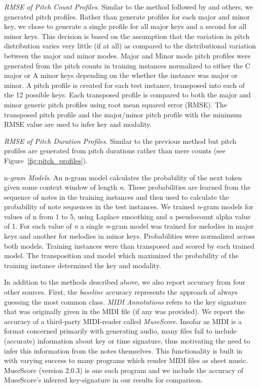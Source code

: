\documentclass[letterpaper]{article}
\begin{document}
\emph{RMSE of Pitch Count Profiles}. Similar to the method followed by \cite{krumhansl2001cognitive} and others, we generated pitch profiles. Rather than generate profiles for each major and minor key, we chose to generate a single profile for all major keys and a second for all minor keys. This decision is based on the assumption that the variation in pitch distribution varies very little (if at all) as compared to the distributional variation between the major and minor modes. Major and Minor mode pitch profiles were generated from the pitch counts in training instances normalized to either the C major or A minor keys depending on the whether the instance was major or minor. A pitch profile is created for each test instance, transposed into each of the 12 possible keys. Each transposed profile is compared to both the major and minor generic pitch profiles using root mean squared error (RMSE). The transposed pitch profile and the major/minor pitch profile with the minimum RMSE value are used to infer key and modality.

\emph{RMSE of Pitch Duration Profiles}. Similar to the previous method but pitch profiles are generated from pitch durations rather than mere counts (see Figure~\ref{fig:pitch_profiles}). 

n\emph{-gram Models}. An n-gram model calculates the probability of the next token given some context window of length \emph{n}. These probabilities are learned from the sequence of notes in the training instances and then used to calculate the probability of note sequences in the test instances. We trained \emph{n}-gram models for values of n from 1 to 5, using Laplace smoothing and a pseudocount alpha value of 1. For each value of \emph{n} a single \emph{n}-gram model was trained for melodies in major keys and another for melodies in minor keys. Probabilities were normalized across both models. Training instances were than transposed and scored by each trained model. The transposition and model which maximized the probability of the training instance determined the key and modality.

In addition to the methods described above, we also report accuracy from four other sources. First, the \emph{baseline} accuracy represents the approach of always guessing the most common class. \emph{MIDI Annotations} refers to the key signature that was originally given in the MIDI file (if any was provided). We report the accuracy of a third-party MIDI-reader called \emph{MuseScore}. Insofar as MIDI is a format concerned primarily with generating audio, many files fail to include (accurate) information about key or time signature, thus motivating the need to infer this information from the notes themselves. This functionality is built in with varying success to many programs which render MIDI files as sheet music. MuseScore (version 2.0.3) is one such program and we include the accuracy of MuseScore's inferred key-signature in our results for comparison.
\end{document}
